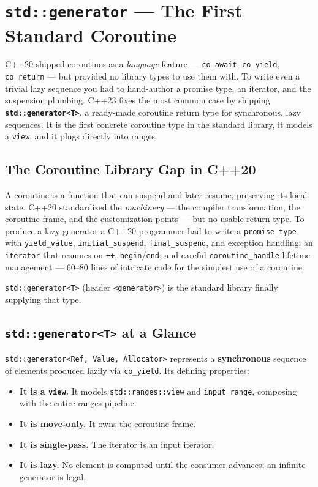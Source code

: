 \chapter{\texttt{std::generator} --- The First Standard Coroutine}
\label{ch:std-generator}

C++20 shipped coroutines as a \emph{language} feature --- \lstinline|co_await|, \lstinline|co_yield|, \lstinline|co_return| --- but provided no library types to use them with. To write even a trivial lazy sequence you had to hand-author a promise type, an iterator, and the suspension plumbing. C++23 fixes the most common case by shipping \textbf{\lstinline|std::generator<T>|}, a ready-made coroutine return type for synchronous, lazy sequences. It is the first concrete coroutine type in the standard library, it models a \lstinline|view|, and it plugs directly into ranges.

\section{The Coroutine Library Gap in C++20}

A coroutine is a function that can suspend and later resume, preserving its local state. C++20 standardized the \emph{machinery} --- the compiler transformation, the coroutine frame, and the customization points --- but no usable return type. To produce a lazy generator a C++20 programmer had to write a \lstinline|promise_type| with \lstinline|yield_value|, \lstinline|initial_suspend|, \lstinline|final_suspend|, and exception handling; an \lstinline|iterator| that resumes on \lstinline|++|; \lstinline|begin|/\lstinline|end|; and careful \lstinline|coroutine_handle| lifetime management --- 60--80 lines of intricate code for the simplest use of a coroutine.

\lstinline|std::generator<T>| (header \lstinline|<generator>|) is the standard library finally supplying that type.

\section{\texttt{std::generator<T>} at a Glance}

\lstinline|std::generator<Ref, Value, Allocator>| represents a \textbf{synchronous} sequence of elements produced lazily via \lstinline|co_yield|. Its defining properties:

\begin{itemize}
    \item \textbf{It is a \lstinline|view|.} It models \lstinline|std::ranges::view| and \lstinline|input_range|, composing with the entire ranges pipeline.
    \item \textbf{It is move-only.} It owns the coroutine frame.
    \item \textbf{It is single-pass.} The iterator is an input iterator.
    \item \textbf{It is lazy.} No element is computed until the consumer advances; an infinite generator is legal.
\end{itemize}

